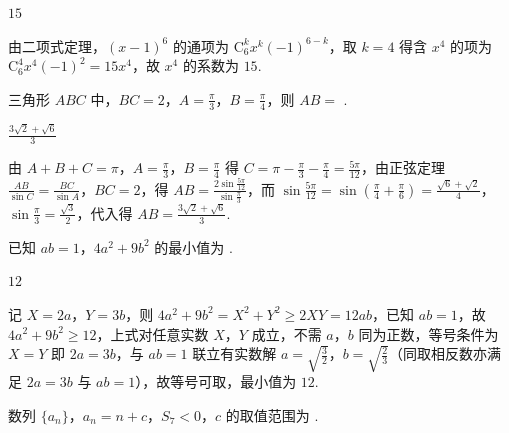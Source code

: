 \begin{answer}
\(15\)
\end{answer}

\begin{solution}
由二项式定理，\(\left(x-1\right)^{6}\) 的通项为 \(\mathrm C_{6}^{k}x^{k}\left(-1\right)^{6-k}\)，取 \(k=4\) 得含 \(x^{4}\) 的项为 \(\mathrm C_{6}^{4}x^{4}\left(-1\right)^{2}=15x^{4}\)，故 \(x^{4}\) 的系数为 \(15\).
\end{solution}

\begin{problem}
三角形 \(ABC\) 中，\(BC=2\)，\(A=\frac{\pi}{3}\)，\(B=\frac{\pi}{4}\)，则 \(AB=\)\fillinblank{} .
\end{problem}

\begin{answer}
\(\frac{3\sqrt{2}+\sqrt{6}}{3}\)
\end{answer}

\begin{solution}
由 \(A+B+C=\pi\)，\(A=\frac{\pi}{3}\)，\(B=\frac{\pi}{4}\) 得 \(C=\pi-\frac{\pi}{3}-\frac{\pi}{4}=\frac{5\pi}{12}\)，由正弦定理 \(\frac{AB}{\sin C}=\frac{BC}{\sin A}\)，\(BC=2\)，得 \(AB=\frac{2\sin\frac{5\pi}{12}}{\sin\frac{\pi}{3}}\)，而 \(\sin\frac{5\pi}{12}=\sin\left(\frac{\pi}{4}+\frac{\pi}{6}\right)=\frac{\sqrt{6}+\sqrt{2}}{4}\)，\(\sin\frac{\pi}{3}=\frac{\sqrt{3}}{2}\)，代入得 \(AB=\frac{3\sqrt{2}+\sqrt{6}}{3}\).
\end{solution}

\begin{problem}
已知 \(ab=1\)，\(4a^2+9b^2\) 的最小值为\fillinblank{} .
\end{problem}

\begin{answer}
\(12\)
\end{answer}

\begin{solution}
记 \(X=2a\)，\(Y=3b\)，则 \(4a^{2}+9b^{2}=X^{2}+Y^{2}\ge 2XY=12ab\)，已知 \(ab=1\)，故 \(4a^{2}+9b^{2}\ge 12\)，上式对任意实数 \(X\)，\(Y\) 成立，不需 \(a\)，\(b\) 同为正数，等号条件为 \(X=Y\) 即 \(2a=3b\)，与 \(ab=1\) 联立有实数解 \(a=\sqrt{\frac{3}{2}}\)，\(b=\sqrt{\frac{2}{3}}\)（同取相反数亦满足 \(2a=3b\) 与 \(ab=1\)），故等号可取，最小值为 \(12\).
\end{solution}

\begin{problem}
数列 \(\{a_n\}\)，\(a_n=n+c\)，\(S_7<0\)，\(c\) 的取值范围为\fillinblank{} .
\end{problem}

